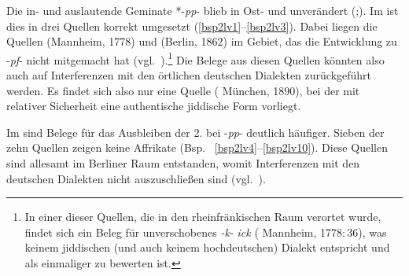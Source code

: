 {Die in- und auslautende Geminate {\westgerm} *-\textit{pp}- blieb in Ost- und  unverändert (\citealt[189]{Kleine2008};\citealt[323–327]{Bin-Nun1973}). Im  ist dies in drei Quellen korrekt umgesetzt (\ref{bsp2lv1}–\ref{bsp2lv3}). Dabei liegen die Quellen  (Mannheim, 1778) und  (Berlin, 1862) im Gebiet, das die Entwicklung zu -\textit{pf}- nicht mitgemacht hat (vgl.\, \citealt[64f]{Koenig1978}).\footnote{In einer dieser Quellen, die in den rheinfränkischen Raum verortet wurde, findet sich ein Beleg für unverschobenes {\germ} \textit{-k-} \textit{ick}  ( Mannheim, 1778:\,36), was keinem jiddischen (und auch keinem hochdeutschen) Dialekt entspricht und als einmaliger  zu bewerten ist.} Die Belege aus diesen Quellen könnten also auch auf Interferenzen mit den örtlichen deutschen Dialekten zurückgeführt werden. Es findet sich also nur eine Quelle ( München, 1890), bei der mit relativer Sicherheit eine authentische jiddische Form vorliegt.
  

Im   sind Belege für das Ausbleiben der 2.  bei {\westgerm} -\textit{pp}- deutlich häufiger. Sieben der zehn Quellen zeigen keine Affrikate (Bsp. \,%
\ref{bsp2lv4}–\ref{bsp2lv10}). Diese Quellen sind allesamt im Berliner Raum entstanden, womit Interferenzen mit den deutschen Dialekten nicht auszuschließen sind (vgl.\, \citealt[64f]{Koenig1978}). 
 
  }
